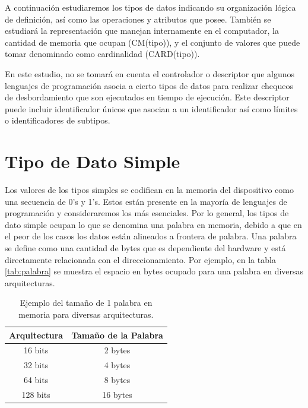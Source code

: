 A continuación estudiaremos los tipos de datos indicando su organización lógica de definición, así como las operaciones y atributos que posee. También se estudiará la representación que manejan internamente en el computador, la cantidad de memoria que ocupan (CM(tipo)), y el conjunto de valores que puede tomar denominado como cardinalidad (CARD(tipo)).

En este estudio, no se tomará en cuenta el controlador o descriptor que algunos lenguajes de programación asocia a cierto tipos de datos para realizar chequeos de desbordamiento que son ejecutados en tiempo de ejecución. Este descriptor puede incluir identificador únicos que asocian a un identificador así como límites o identificadores de subtipos.

\section{Tipo de Dato Simple}

Los valores de los tipos simples se codifican en la memoria del dispositivo como una secuencia de 0's y 1's. Estos están presente en la mayoría de lenguajes de programación y consideraremos los más esenciales. Por lo general, los tipos de dato simple ocupan lo que se denomina una palabra en memoria, debido a que en el peor de los casos los datos están alineados a frontera de palabra. Una palabra se define como una cantidad de bytes que es dependiente del hardware y está directamente relacionada con el direccionamiento. Por ejemplo, en la tabla \ref{tab:palabra} se muestra el espacio en bytes ocupado para una palabra en diversas arquitecturas.
\begin{center}
\begin{table}[h]
\centering
\begin{tabular}{@{}cc@{}}
\toprule
\multicolumn{1}{l}{Arquitectura} & \multicolumn{1}{l}{Tamaño de la Palabra} \\ \midrule
16 bits                          & 2 bytes                                  \\
32 bits                          & 4 bytes                                  \\
64 bits                          & 8 bytes                                  \\
128 bits                         & 16 bytes                                 \\ \bottomrule
\end{tabular}
\caption{Ejemplo del tamaño de 1 palabra en memoria para diversas arquitecturas.}
\end{table}
\label{tab:palabra}
\end{center}

